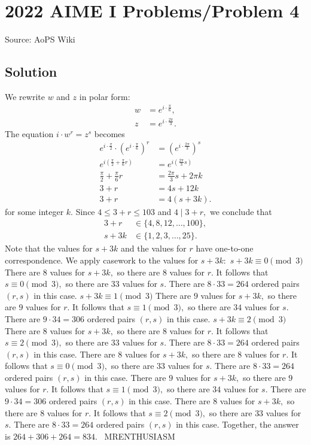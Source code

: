 \documentclass[12pt]{article}
\begin{document}
\section*{{2022 AIME I Problems/Problem 4}}
Source: AoPS Wiki

\subsection*{Solution}
We rewrite $w$ and $z$ in polar form: \begin{align*} w &= e^{i\cdot\frac{\pi}{6}}, \\ z &= e^{i\cdot\frac{2\pi}{3}}. \end{align*} The equation $i \cdot w^r = z^s$ becomes \begin{align*} e^{i\cdot\frac{\pi}{2}} \cdot \left(e^{i\cdot\frac{\pi}{6}}\right)^r &= \left(e^{i\cdot\frac{2\pi}{3}}\right)^s \\ e^{i\left(\frac{\pi}{2}+\frac{\pi}{6}r\right)} &= e^{i\left(\frac{2\pi}{3}s\right)} \\ \frac{\pi}{2}+\frac{\pi}{6}r &= \frac{2\pi}{3}s+2\pi k \\ 3+r &= 4s+12k \\ 3+r &= 4(s+3k). \end{align*} for some integer $k.$ Since $4\leq 3+r\leq 103$ and $4\mid 3+r,$ we conclude that \begin{align*} 3+r &\in \{4,8,12,\ldots,100\}, \\ s+3k &\in \{1,2,3,\ldots,25\}. \end{align*} Note that the values for $s+3k$ and the values for $r$ have one-to-one correspondence. We apply casework to the values for $s+3k:$ $s+3k\equiv0\pmod{3}$ There are $8$ values for $s+3k,$ so there are $8$ values for $r.$ It follows that $s\equiv0\pmod{3},$ so there are $33$ values for $s.$ There are $8\cdot33=264$ ordered pairs $(r,s)$ in this case. $s+3k\equiv1\pmod{3}$ There are $9$ values for $s+3k,$ so there are $9$ values for $r.$ It follows that $s\equiv1\pmod{3},$ so there are $34$ values for $s.$ There are $9\cdot34=306$ ordered pairs $(r,s)$ in this case. $s+3k\equiv2\pmod{3}$ There are $8$ values for $s+3k,$ so there are $8$ values for $r.$ It follows that $s\equiv2\pmod{3},$ so there are $33$ values for $s.$ There are $8\cdot33=264$ ordered pairs $(r,s)$ in this case. There are $8$ values for $s+3k,$ so there are $8$ values for $r.$ It follows that $s\equiv0\pmod{3},$ so there are $33$ values for $s.$ There are $8\cdot33=264$ ordered pairs $(r,s)$ in this case. There are $9$ values for $s+3k,$ so there are $9$ values for $r.$ It follows that $s\equiv1\pmod{3},$ so there are $34$ values for $s.$ There are $9\cdot34=306$ ordered pairs $(r,s)$ in this case. There are $8$ values for $s+3k,$ so there are $8$ values for $r.$ It follows that $s\equiv2\pmod{3},$ so there are $33$ values for $s.$ There are $8\cdot33=264$ ordered pairs $(r,s)$ in this case. Together, the answer is $264+306+264=\boxed{834}.$ ~MRENTHUSIASM
\end{document}
